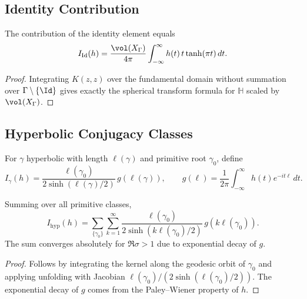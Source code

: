 \subsection{Identity Contribution}\relax\hspace{0pt}
\label{subsec:identity}\relax\hspace{0pt}

\begin{lemma}\label{lem:identity-term}\relax
The contribution of the identity element equals
\[
I_{\mathrm{Id}}(h)=\frac{\vol(X_\Gamma)}{4\pi}\int_{-\infty}^{\infty}h(t)\,t\tanh(\pi t)\,dt.
\]
\end{lemma}

\begin{proof}\relax
Integrating $K(z,z)$ over the fundamental domain without summation over $\Gamma\setminus\{\Id\}$ gives exactly the spherical transform formula for $\mathbb{H}$ scaled by $\vol(X_\Gamma)$. %
\end{proof}

\subsection{Hyperbolic Conjugacy Classes}\relax\hspace{0pt}
\label{subsec:hyperbolic}\relax\hspace{0pt}

\begin{definition}\label{def:orbital-hyp}\relax
For $\gamma$ hyperbolic with length $\ell(\gamma)$ and primitive root $\gamma_0$, define
\[
I_{\gamma}(h)=\frac{\ell(\gamma_0)}{2\sinh(\ell(\gamma)/2)}\,g(\ell(\gamma)),\qquad
g(\ell)=\frac{1}{2\pi}\int_{-\infty}^{\infty} h(t)e^{-i t \ell}\,dt.
\]
\end{definition}

\begin{lemma}\label{lem:hyperbolic}\relax
Summing over all primitive classes,
\[
I_{\mathrm{hyp}}(h)=\sum_{\{\gamma_0\}}\sum_{k=1}^{\infty}\frac{\ell(\gamma_0)}{2\sinh(k\ell(\gamma_0)/2)}\,g(k\ell(\gamma_0)).
\]
The sum converges absolutely for $\Re\sigma>1$ due to exponential decay of $g$. %
\end{lemma}

\begin{proof}\relax
Follows by integrating the kernel along the geodesic orbit of $\gamma_0$ and applying unfolding with Jacobian $\ell(\gamma_0)/(2\sinh(\ell(\gamma_0)/2))$. The exponential decay of $g$ comes from the Paley–Wiener property of $h$. %
\end{proof}

